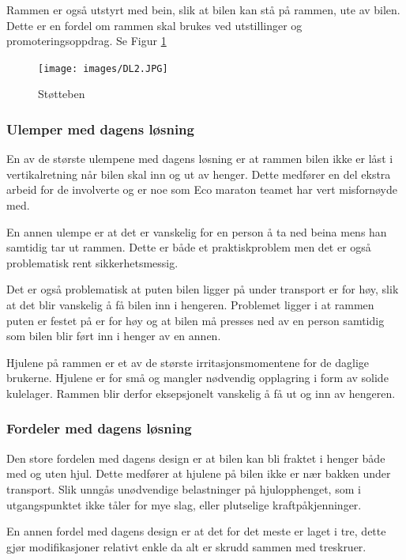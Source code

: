 Rammen er også utstyrt med bein, slik at bilen kan stå på rammen, ute av bilen. Dette er en fordel om rammen skal brukes ved utstillinger og promoteringsoppdrag.  Se Figur \ref{F3} 

\begin{figure}[H]
\centerline{\texttt{[image: images/DL2.JPG]}}
\caption{Støtteben}
\label{F3}
\end{figure}

\subsubsection{Ulemper med dagens løsning}

En av de største ulempene med dagens løsning er at rammen bilen ikke er låst i vertikalretning når bilen skal inn og ut av henger. Dette medfører en del ekstra arbeid for de involverte og er noe som Eco maraton teamet har vert misfornøyde med.

En annen ulempe er at det er vanskelig for en person å ta ned beina mens han samtidig tar ut rammen. Dette er både et praktiskproblem men det er også problematisk rent sikkerhetsmessig. 

Det er også problematisk at puten bilen ligger på under transport er for høy, slik at det blir vanskelig å få bilen inn i hengeren. Problemet ligger i at rammen puten er festet på er for høy og at bilen må presses ned av en person samtidig som bilen blir ført inn i henger av en annen.

Hjulene på rammen er et av de største irritasjonsmomentene for de daglige brukerne. Hjulene er for små og mangler nødvendig opplagring i form av solide kulelager. Rammen blir derfor eksepsjonelt vanskelig å få ut og inn av hengeren. 

\subsubsection{Fordeler med dagens løsning}

Den store fordelen med dagens design er at bilen kan bli fraktet i henger både med og uten hjul. Dette medfører at hjulene på bilen ikke er nær bakken under transport. Slik unngås unødvendige belastninger på hjulopphenget, som i utgangspunktet ikke tåler for mye slag, eller plutselige kraftpåkjenninger. 

En annen fordel med dagens design er at det for det meste er laget i tre, dette gjør modifikasjoner relativt enkle da alt er skrudd sammen med treskruer.


